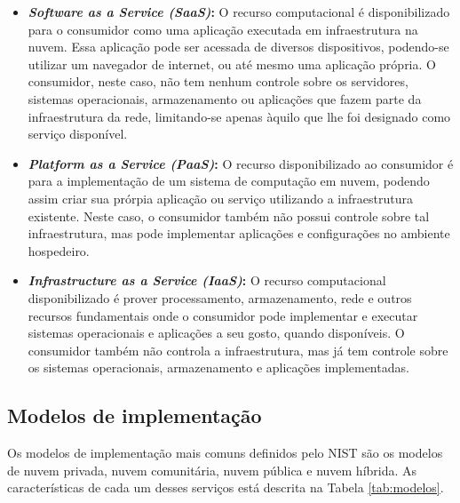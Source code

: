 \documentclass[
	12pt,				%
	a4paper,			%
	english,			%
	french,				%
	spanish,			%
	brazil				%
	]{abntex2}
\begin{document}
\begin{itemize}
	\item \textbf{\emph{Software as a Service (SaaS)}:} O recurso computacional é disponibilizado para o consumidor como uma aplicação executada em infraestrutura na nuvem. Essa aplicação pode ser acessada de diversos dispositivos, podendo-se utilizar um navegador de internet, ou até mesmo uma aplicação própria. O consumidor, neste caso, não tem nenhum controle sobre os servidores, sistemas operacionais, armazenamento ou aplicações que fazem parte da infraestrutura da rede, limitando-se apenas àquilo que lhe foi designado como serviço disponível.
	\item \textbf{\emph{Platform as a Service (PaaS)}:} O recurso disponibilizado ao consumidor é para a implementação de um sistema de computação em nuvem, podendo assim criar sua prórpia aplicação ou serviço utilizando a infraestrutura existente. Neste caso, o consumidor também não possui controle sobre tal infraestrutura, mas pode implementar aplicações e configurações no ambiente hospedeiro.
	\item \textbf{\emph{Infrastructure as a Service (IaaS)}:} O recurso computacional disponibilizado é prover processamento, armazenamento, rede e outros recursos fundamentais onde o consumidor pode implementar e executar sistemas operacionais e aplicações a seu gosto, quando disponíveis. O consumidor também não controla a infraestrutura, mas já tem controle sobre os sistemas operacionais, armazenamento e aplicações implementadas.
\end{itemize}

\subsection{Modelos de implementação}\label{modelosimp}

Os modelos de implementação mais comuns definidos pelo NIST são os modelos de nuvem privada, nuvem comunitária, nuvem pública e nuvem híbrida. As características de cada um desses serviços está descrita na Tabela \ref{tab:modelos}.
\end{document}
